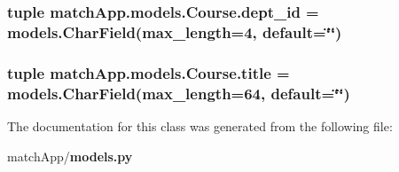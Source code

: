 \subsubsection[{dept\+\_\+id}]{\setlength{\rightskip}{0pt plus 5cm}tuple match\+App.\+models.\+Course.\+dept\+\_\+id = models.\+Char\+Field(max\+\_\+length=4, default=\char`\"{}\char`\"{})\hspace{0.3cm}{\ttfamily [static]}}\label{classmatch_app_1_1models_1_1_course_a1ed41be5dd960488ff6fe01eb27074f0}
\subsubsection[{title}]{\setlength{\rightskip}{0pt plus 5cm}tuple match\+App.\+models.\+Course.\+title = models.\+Char\+Field(max\+\_\+length=64, default=\char`\"{}\char`\"{})\hspace{0.3cm}{\ttfamily [static]}}\label{classmatch_app_1_1models_1_1_course_afaa80992df56f2f15372c2c523b081c5}


The documentation for this class was generated from the following file\+:\begin{DoxyCompactItemize}
\item 
match\+App/{\bf models.\+py}\end{DoxyCompactItemize}
